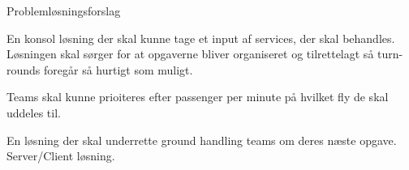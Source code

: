 Problemløsningsforslag

En konsol løsning der skal kunne tage et input af services, der skal behandles. Løsningen skal sørger for at opgaverne bliver organiseret og tilrettelagt så turn-rounds foregår så hurtigt som muligt.

Teams skal kunne prioiteres efter passenger per minute på hvilket fly de skal uddeles til.

En løsning der skal underrette ground handling teams om deres næste opgave. Server/Client løsning.

